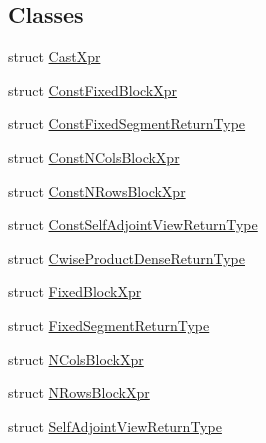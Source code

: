 \subsection*{Classes}
\begin{DoxyCompactItemize}
\item 
struct \mbox{\hyperlink{struct_eigen_1_1_sparse_matrix_base_1_1_cast_xpr}{Cast\+Xpr}}
\item 
struct \mbox{\hyperlink{struct_eigen_1_1_sparse_matrix_base_1_1_const_fixed_block_xpr}{Const\+Fixed\+Block\+Xpr}}
\item 
struct \mbox{\hyperlink{struct_eigen_1_1_sparse_matrix_base_1_1_const_fixed_segment_return_type}{Const\+Fixed\+Segment\+Return\+Type}}
\item 
struct \mbox{\hyperlink{struct_eigen_1_1_sparse_matrix_base_1_1_const_n_cols_block_xpr}{Const\+N\+Cols\+Block\+Xpr}}
\item 
struct \mbox{\hyperlink{struct_eigen_1_1_sparse_matrix_base_1_1_const_n_rows_block_xpr}{Const\+N\+Rows\+Block\+Xpr}}
\item 
struct \mbox{\hyperlink{struct_eigen_1_1_sparse_matrix_base_1_1_const_self_adjoint_view_return_type}{Const\+Self\+Adjoint\+View\+Return\+Type}}
\item 
struct \mbox{\hyperlink{struct_eigen_1_1_sparse_matrix_base_1_1_cwise_product_dense_return_type}{Cwise\+Product\+Dense\+Return\+Type}}
\item 
struct \mbox{\hyperlink{struct_eigen_1_1_sparse_matrix_base_1_1_fixed_block_xpr}{Fixed\+Block\+Xpr}}
\item 
struct \mbox{\hyperlink{struct_eigen_1_1_sparse_matrix_base_1_1_fixed_segment_return_type}{Fixed\+Segment\+Return\+Type}}
\item 
struct \mbox{\hyperlink{struct_eigen_1_1_sparse_matrix_base_1_1_n_cols_block_xpr}{N\+Cols\+Block\+Xpr}}
\item 
struct \mbox{\hyperlink{struct_eigen_1_1_sparse_matrix_base_1_1_n_rows_block_xpr}{N\+Rows\+Block\+Xpr}}
\item 
struct \mbox{\hyperlink{struct_eigen_1_1_sparse_matrix_base_1_1_self_adjoint_view_return_type}{Self\+Adjoint\+View\+Return\+Type}}
\end{DoxyCompactItemize}
